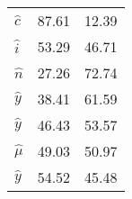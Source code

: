 \begin{center}
\begin{longtable}{lcc}
${\hat c}    $	 & 	                  87.61	 & 	                  12.39 \\ 
${\hat i}    $	 & 	                  53.29	 & 	                  46.71 \\ 
${\hat n}    $	 & 	                  27.26	 & 	                  72.74 \\ 
${\hat y}    $	 & 	                  38.41	 & 	                  61.59 \\ 
${\hat y}    $	 & 	                  46.43	 & 	                  53.57 \\ 
${\hat \mu}  $	 & 	                  49.03	 & 	                  50.97 \\ 
${\hat y}    $	 & 	                  54.52	 & 	                  45.48 \\ 
\end{longtable}
 \end{center}
